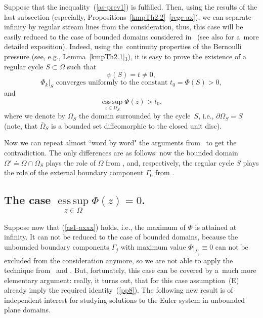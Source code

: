 \documentclass[11pt]{article}
\numberwithin{equation}{section}
\numberwithin{figure}{section}
\newcommand{\esssup}{\mathop{\mathrm{ess\,sup}}}
\begin{document}
Suppose that the inequality~(\ref{as-prev1}) is fulfilled. Then, using the results of the last subsection (especially, Propositions~\ref{kmpTh2.2}--\ref{regc-ax}), we can separate infinity by regular stream lines from the consideration, thus, this case will be easily reduced to the case of bounded domains considered in~\cite{korobkov2015solution} (see also  \cite[Chapter~5]{korobkov2024steady} for a~more detailed exposition). Indeed, using the~continuity properties of the Bernoulli pressure (see, e.g., Lemma~\ref{kmpTh2.1}$_3$), it is easy to prove the existence of a regular cycle $S\subset\Omega$ such that
\begin{equation}
\label{sm1}  \psi(S)=t\ne0,
\end{equation}
\begin{equation}
\label{sm2}  \Phi_k|_S\mbox{ \ converges uniformly to
the constant~}t_0=\Phi(S)>0,\end{equation}
and
\begin{equation}
\label{sm3}  \esssup\limits_{z\in\Omega_S}\Phi(z)>t_0,
\end{equation}
where we denote by $\Omega_S$ the domain surrounded by the cycle~$S$, i.e., $\partial\Omega_S=S$ (note, that $\bar\Omega_S$ is a bounded set diffeomorphic  to the closed unit disc).

Now we can repeat almost ``word by word" the arguments from~\cite[Section~5.5]{korobkov2024steady} to get the contradiction. The only differences are as follows: now the bounded domain $\Omega'\doteq \Omega\cap\Omega_S$ plays the role of $\Omega$ from \cite[Section~5.5]{korobkov2024steady}, and, respectively, the regular cycle $S$ plays the role of the external boundary component $\Gamma_0$ from \cite[Section~5.5]{korobkov2024steady}.

\subsection*{The case $\esssup\limits_{z\in\Omega}\Phi(z)=0$.}\label{Euler-contr-2}

Suppose now that (\ref{as1-axxx}) holds, i.e., the maximum of
$\Phi$ is attained at
infinity. It can not be reduced to the case of bounded domains, because the unbounded boundary components $\Gamma_j$ with maximum value $\Phi|_{\Gamma_j}\equiv0$ can not be excluded from the consideration anymore, so we are not able to apply the technique from~\cite{korobkov2015solution} and \cite[Chapter~5]{korobkov2024steady}. But, fortunately, this case can be covered by a~much more elementary argument: really, it turns out, that for this case assumption~(E) already imply the required identity~(\ref{pp8}). 
The following new result is of independent interest for studying solutions to the Euler system in unbounded plane domains.
\end{document}
